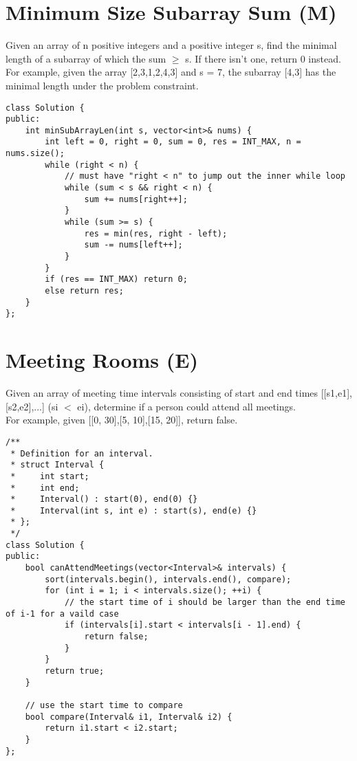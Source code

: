 \section{Minimum Size Subarray Sum (M)}
Given an array of n positive integers and a positive integer s, find the minimal length of a subarray of which the sum $\geq$ s. If there isn't one, return 0 instead.\\

For example, given the array [2,3,1,2,4,3] and s = 7, the subarray [4,3] has the minimal length under the problem constraint. \\

\begin{lstlisting}
class Solution {
public:
    int minSubArrayLen(int s, vector<int>& nums) {
        int left = 0, right = 0, sum = 0, res = INT_MAX, n = nums.size();
        while (right < n) {
            // must have "right < n" to jump out the inner while loop
            while (sum < s && right < n) {  
                sum += nums[right++];
            }
            while (sum >= s) {
                res = min(res, right - left);
                sum -= nums[left++];
            }
        }
        if (res == INT_MAX) return 0;
        else return res;
    }
};
\end{lstlisting}


\section{Meeting Rooms (E)}
Given an array of meeting time intervals consisting of start and end times [[s1,e1],[s2,e2],...] (si $<$ ei), determine if a person could attend all meetings.\\

For example, given [[0, 30],[5, 10],[15, 20]], return false.\\

\begin{lstlisting}
/** 
 * Definition for an interval. 
 * struct Interval { 
 *     int start; 
 *     int end; 
 *     Interval() : start(0), end(0) {} 
 *     Interval(int s, int e) : start(s), end(e) {} 
 * }; 
 */
class Solution {
public:
    bool canAttendMeetings(vector<Interval>& intervals) {
        sort(intervals.begin(), intervals.end(), compare);
        for (int i = 1; i < intervals.size(); ++i) {
            // the start time of i should be larger than the end time of i-1 for a vaild case
            if (intervals[i].start < intervals[i - 1].end) {
                return false;
            }
        }
        return true;
    }
    
    // use the start time to compare
    bool compare(Interval& i1, Interval& i2) {
        return i1.start < i2.start;
    }
};
\end{lstlisting}


